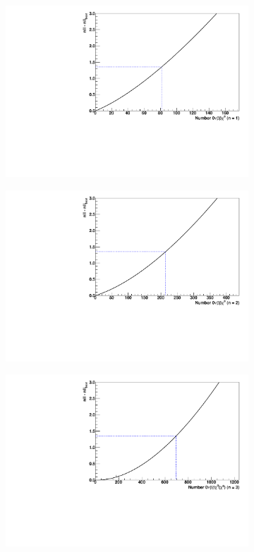 \documentclass[herrin-thesis.tex]{subfiles}
\begin{document}
\begin{figure}[htp]
\centering
	\begin{subfigure}[c]{0.48\textwidth}
	\centering
	\includegraphics[width=\textwidth]{./plots/analysis_bb0nX1_profile.pdf}
	\end{subfigure}\hfill%
	\begin{subfigure}[c]{0.48\textwidth}
	\centering
	\includegraphics[width=\textwidth]{./plots/analysis_bb0nX2_profile.pdf}
	\end{subfigure}
	\begin{subfigure}[c]{0.48\textwidth}
	\centering
	\includegraphics[width=\textwidth]{./plots/analysis_bb0nX3_profile.pdf}

\end{subfigure}
\end{figure}
\end{document}
